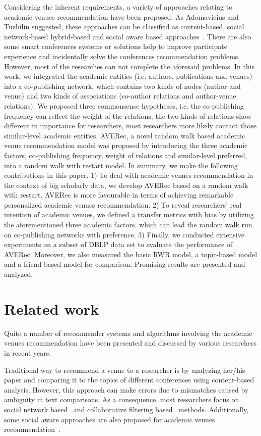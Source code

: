 \documentclass[9pt]{acm_proc_article-sp}
\begin{document}
Considering the inherent requirements, a variety of approaches relating to academic venues recommendation have been proposed. As Adomavicius and Tuzhilin suggested, these approaches can be classified as content-based, social network-based hybrid-based and social aware based approaches~\cite{adomavicius2005toward}. There are also some smart conferences systems or solutions help to improve participate experience and incidentally solve the conferences recommendation problems. However, most of the researches can not complete the aforesaid problems. In this work, we integrated the academic entities (i.e. authors, publications and venues) into a co-publishing network, which contains two kinds of nodes (author and venue) and two kinds of associations (co-author relations and author-venue relations). We proposed three commonsense  hypotheses, i.e. the co-publishing frequency can reflect the weight of the relations, the two kinds of relations show different in importance for researchers, most researchers more likely contact those similar-level academic entities. AVERec, a novel random walk based academic venue recommendation model was proposed by introducing the three academic factors, co-publishing frequency, weight of relations and similar-level preferred, into a random walk with restart model. In summary, we make the following contributions in this paper. 1) To deal with academic venues recommendation in the context of big scholarly data, we develop AVERec based on a random walk with restart. AVERec is more favourable in terms of achieving remarkable personalized academic venues recommendation. 2) To reveal researchers' real intention of academic venues, we defined a transfer metrics with bias by utilizing the aforementioned three academic factors. which can lead the random walk run on co-publishing networks with preference. 3) Finally, we conducted extensive experiments on a subset of DBLP data set to evaluate the performance of AVERec. Moreover, we also measured the basic RWR model, a topic-based model and a friend-based model for comparison. Promising results are presented and analyzed.

\section{Related work}
Quite a number of recommender systems and algorithms involving the academic venues recommendation have been presented and discussed by various researchers in recent years.

Traditional way to recommend a venue to a researcher is by analyzing her/his paper and comparing it to the topics of different conferences using content-based analysis. However, this approach can make errors due to mismatches caused by ambiguity in text comparisons. As a consequence, most researchers focus on social network based~\cite{luong2012publication,chen2012social} and collaborative filtering based~\cite{pham2011clustering,yang2012venue} methods. Additionally, some social aware approaches are also proposed for academic venues recommendation~\cite{asabere2014improving,xia2013socially,hornick2012extending}.
\end{document}
